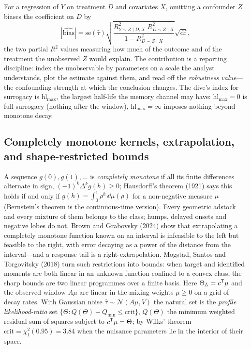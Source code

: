 For a regression of $Y$ on treatment $D$ and covariates $X$, omitting a confounder $Z$ biases the coefficient on $D$ by
\begin{equation}
|\widehat{\text{bias}}| = \mathrm{se}(\hat\tau)\sqrt{\frac{R^2_{Y \sim Z \mid D, X}\;R^2_{D \sim Z \mid X}}{1 - R^2_{D \sim Z \mid X}}}\sqrt{\mathrm{df}},
\label{eq:surr:ch}
\end{equation}
the two partial $R^2$ values measuring how much of the outcome and of the treatment the unobserved $Z$ would explain. The contribution is a reporting discipline: index the unobservable by parameters on a scale the analyst understands, plot the estimate against them, and read off the \emph{robustness value}---the confounding strength at which the conclusion changes. The dive's index for surrogacy is $\mathrm{hl}_{\max}$, the largest half-life the memory channel may have: $\mathrm{hl}_{\max} = 0$ is full surrogacy (nothing after the window), $\mathrm{hl}_{\max} = \infty$ imposes nothing beyond monotone decay.

\subsection{Completely monotone kernels, extrapolation, and shape-restricted bounds}

A sequence $g(0), g(1), \ldots$ is \emph{completely monotone} if all its finite differences alternate in sign, $(-1)^k\Delta^k g(h) \ge 0$; Hausdorff's theorem (1921) says this holds if and only if $g(h) = \int_0^1\rho^h\,\dd\mu(\rho)$ for a non-negative measure $\mu$ (Bernstein's theorem is the continuous-time version). Every geometric adstock and every mixture of them belongs to the class; humps, delayed onsets and negative lobes do not. Brown and Grabovsky (2024) show that extrapolating a completely monotone function known on an interval is infeasible to the left but feasible to the right, with error decaying as a power of the distance from the interval---and a response tail is a right-extrapolation. Mogstad, Santos and Torgovitsky (2018) turn such restrictions into bounds: when target and identified moments are both linear in an unknown function confined to a convex class, the sharp bounds are two linear programmes over a finite basis. Here $\Theta_L = c^{\mathsf{T}}\mu$ and the observed window $A\mu$ are linear in the mixing weights $\mu \ge 0$ on a grid of decay rates. With Gaussian noise $\hat\tau \sim \mathcal N(A\mu, V)$ the natural set is the \emph{profile likelihood-ratio} set $\{\Theta : Q(\Theta) - Q_{\min} \le \mathrm{crit}\}$, $Q(\Theta)$ the minimum weighted residual sum of squares subject to $c^{\mathsf{T}}\mu = \Theta$; by Wilks' theorem $\mathrm{crit} = \chi^2_1(0.95) = 3.84$ when the nuisance parameters lie in the interior of their space.

